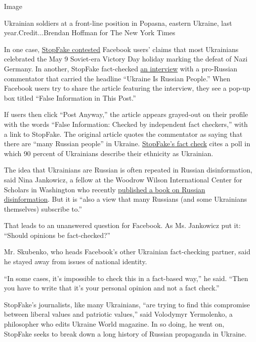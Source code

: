 Image

Ukrainian soldiers at a front-line position in Popasna, eastern Ukraine,
last year.Credit...Brendan Hoffman for The New York Times

In one case,
\href{https://www.stopfake.org/ru/fejk-dlya-90-ukraintsev-den-pobedy-yavlyaetsya-prazdnikom/}{StopFake
contested} Facebook users' claims that most Ukrainians celebrated the
May 9 Soviet-era Victory Day holiday marking the defeat of Nazi Germany.
In another, StopFake fact-checked
\href{https://golospravdy.eu/elena-markosyan-ukraina-eto-russkie-lyudi/}{an
interview} with a pro-Russian commentator that carried the headline
``Ukraine Is Russian People.'' When Facebook users try to share the
article featuring the interview, they see a pop-up box titled ``False
Information in This Post.''

If users then click ``Post Anyway,'' the article appears grayed-out on
their profile with the words ``False Information: Checked by independent
fact checkers,'' with a link to StopFake. The original article quotes
the commentator as saying that there are ``many Russian people'' in
Ukraine.
\href{https://www.stopfake.org/ru/fejk-ukraintsy-eto-russkie-lyudi/}{StopFake's
fact check} cites a poll in which 90 percent of Ukrainians describe
their ethnicity as Ukrainian.

The idea that Ukrainians are Russian is often repeated in Russian
disinformation, said Nina Jankowicz, a fellow at the Woodrow Wilson
International Center for Scholars in Washington who recently
\href{https://www.wilsoncenter.org/book/how-lose-information-war-russia-fake-news-and-future-conflict}{published
a book on Russian disinformation}. But it is ``also a view that many
Russians (and some Ukrainians themselves) subscribe to.''

That leads to an unanswered question for Facebook. As Ms. Jankowicz put
it: ``Should opinions be fact-checked?''

Mr. Skubenko, who heads Facebook's other Ukrainian fact-checking
partner, said he stayed away from issues of national identity.

``In some cases, it's impossible to check this in a fact-based way,'' he
said. ``Then you have to write that it's your personal opinion and not a
fact check.''

StopFake's journalists, like many Ukrainians, ``are trying to find this
compromise between liberal values and patriotic values,'' said Volodymyr
Yermolenko, a philosopher who edits Ukraine World magazine. In so doing,
he went on, StopFake seeks to break down a long history of Russian
propaganda in Ukraine.


